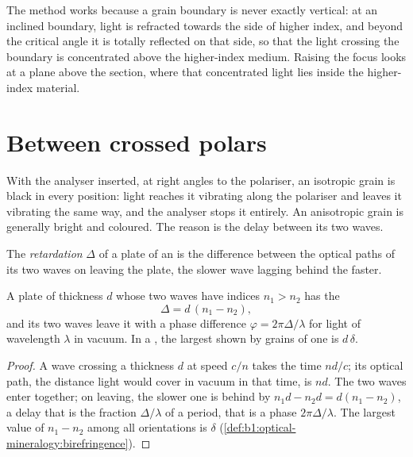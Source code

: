 The method works because a grain boundary is never exactly vertical: at an
inclined boundary, light is refracted towards the side of higher index, and
beyond the critical angle it is totally reflected on that side, so that the
light crossing the boundary is concentrated above the higher-index medium.
Raising the focus looks at a plane above the section, where that concentrated
light lies inside the higher-index material.

\section{Between crossed polars}

With the analyser inserted, at right angles to the polariser, an isotropic
grain is black in every position: light reaches it vibrating along the
polariser and leaves it vibrating the same way, and the analyser stops it
entirely. An anisotropic grain is generally bright and coloured. The reason
is the delay between its two waves.

\begin{definition}\label{def:b1:optical-mineralogy:retardation}
The \emph{retardation} $\Delta$ of a
plate of an  is the difference between the optical paths of
its two waves on leaving the plate, the slower wave lagging behind the faster.
\end{definition}

\begin{proposition}\label{prop:b1:optical-mineralogy:retardation}
A plate of thickness $d$ whose two waves have indices $n_1 > n_2$ has the
\[
  \Delta = d\,(n_1 - n_2),
\]
and its two waves leave it with a phase difference $\varphi = 2\pi\Delta/\lambda$
for light of wavelength $\lambda$ in vacuum. In a , the
largest  shown by grains of one  is $d\,\delta$.
\end{proposition}

\begin{proof}
A wave crossing a thickness $d$ at speed $c/n$ takes the time $nd/c$; its
optical path, the distance light would cover in vacuum in that time, is $nd$.
The two waves enter together; on leaving, the slower one is behind by
$n_1 d - n_2 d = d(n_1 - n_2)$, a delay that is the fraction $\Delta/\lambda$
of a period, that is a phase $2\pi\Delta/\lambda$. The largest value of
$n_1 - n_2$ among all orientations is $\delta$
(\cref{def:b1:optical-mineralogy:birefringence}).
\end{proof}

